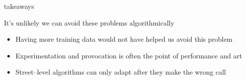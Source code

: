 \documentclass[presentation]{subfiles}
\begin{document}
\begin{frame}

\end{frame}


\begin{frame}{takeaways}
  
  It's unlikely we can avoid these problems algorithmically

\begin{itemize}
  \item Having \alert{more training data} would not have helped us avoid this problem
  \item Experimentation and provocation is often the \alert{point} of performance and art
  \item Street--level algorithms can only adapt \alert{after} they make the wrong call
\end{itemize}

\end{frame}



  

  
  
  




\end{document}
